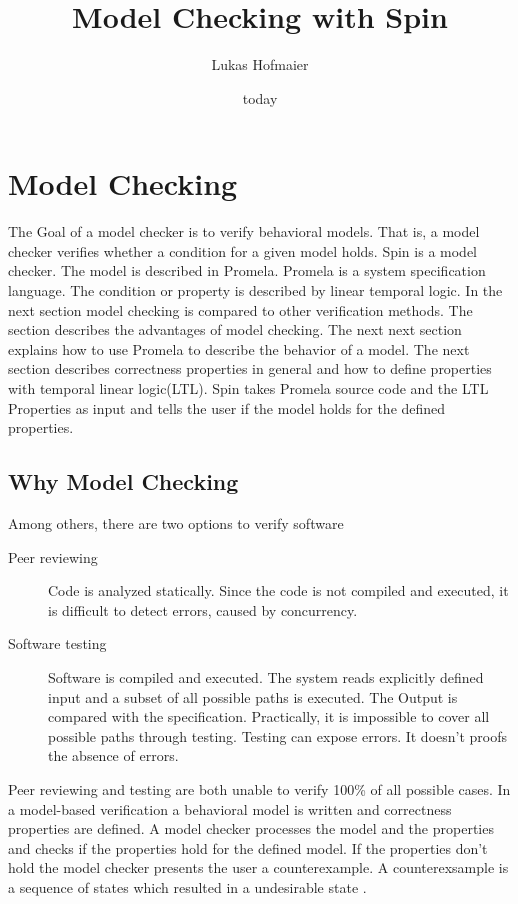 \documentclass[11pt,twoside,a4paper]{article}
\begin{document}
\title{Model Checking with Spin}
\author{Lukas Hofmaier}
\date{today}
\maketitle

\tableofcontents

\section{Model Checking}
\label{sec:modelchecking}

The Goal of a model checker is to verify behavioral models. That is, a model checker verifies whether a condition for a given model holds. Spin is a model checker. The model is described in Promela. Promela is a system specification language. The condition or property is described by linear temporal logic. In the next section model checking is compared to other verification methods. The section describes the advantages of model checking. The next next section explains how to use Promela to describe the behavior of a model. The next section describes correctness properties in general and how to define properties with temporal linear logic(LTL). Spin takes Promela source code and the LTL Properties as input and tells the user if the model holds for the defined properties.

\subsection{Why Model Checking}
\label{sec:why}

Among others, there are two options to verify software
\begin{description}
\item[Peer reviewing] Code is analyzed statically. Since the code is not compiled and executed, it is difficult to detect errors, caused by concurrency.
\item[Software testing] Software is compiled and executed. The system reads explicitly defined input and a subset of all possible paths is executed. The Output is compared with the specification. Practically, it is impossible to cover all possible paths through testing. Testing can expose errors. It doesn't proofs the absence of errors.
\end{description}

Peer reviewing and testing are both unable to verify 100\% of all possible cases. In a model-based verification a behavioral model is written and correctness properties are defined. A model checker processes the model and the properties and checks if the properties hold for the defined model. If the properties don't hold the model checker presents the user a counterexample. A counterexsample is a sequence of states which resulted in a undesirable state \cite{baier08}.
\end{document}
